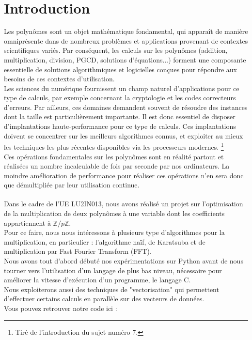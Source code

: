 \documentclass[12pt, a4paper]{article}
\begin{document}
\tableofcontents
\newpage

\section*{Introduction}

Les polynômes sont un objet mathématique fondamental, qui apparaît de manière omniprésente dans de nombreux problèmes et applications provenant de contextes scientifiques variés. Par conséquent, les calculs sur les polynômes (addition, multiplication, division, PGCD, solutions d’équations...) forment une composante essentielle de solutions algorithmiques et logicielles conçues pour répondre aux besoins de ces contextes d’utilisation. \\
\indent Les sciences du numérique fournissent un champ naturel d’applications pour ce type de calculs, par exemple concernant la cryptologie et les codes correcteurs d’erreurs. Par ailleurs, ces domaines demandent souvent de résoudre des instances dont la taille est particulièrement importante. Il est donc essentiel de disposer d’implantations haute-performance pour ce type de calculs. Ces implantations doivent se concentrer sur les meilleurs algorithmes connus, et exploiter au mieux les techniques les plus récentes disponibles via les processeurs modernes. \footnote{Tiré de l'introduction du sujet numéro 7.} \\
\indent Ces opérations fondamentales sur les polynômes sont en réalité partout et réalisées un nombre incalculable de fois par seconde par nos ordinateurs. La moindre amélioration de performance pour réaliser ces opérations n'en sera donc que démultipliée par leur utilisation continue. \\
\ \\
\indent Dans le cadre de l'UE LU2IN013, nous avons réalisé un projet sur l'optimisation de la multiplication de deux polynômes à une variable dont les coefficients appartiennent à $\mathbb{Z}/p\mathbb{Z}$. \\
\indent Pour ce faire, nous nous intéressons à plusieurs type d'algorithmes pour la multiplication, en particulier : l'algorithme naïf, de Karatsuba et de multiplication par Fast Fourier Transform (FFT).\\
\indent Nous avons tout d'abord débuté nos expérimentations sur Python avant de nous tourner vers l'utilisation d'un langage de plus bas niveau, nécessaire pour améliorer la vitesse d'exécution d'un programme, le langage C.\\
\indent Nous exploiterons aussi des techniques de "vectorisation" qui permettent d’effectuer certains calculs en parallèle sur des vecteurs de données.\\[3cm]
Vous pouvez retrouver notre code ici : \href{https://github.com/PiAir2/IN013_Projet}{\textit{\color{blue}{https://github.com/PiAir2/IN013\_Projet}}}
\newpage
\end{document}
